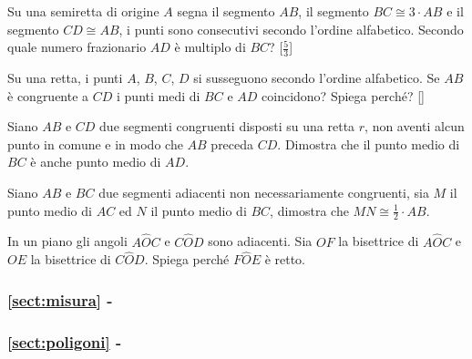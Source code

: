 \begin{multicols}{2}
 
\begin{esercizio}
\label{ese:1.84}
Su una semiretta di origine $A$ segna il segmento $AB$, il segmento 
$BC\cong 3\cdot AB$ e il segmento $CD\cong AB$, i punti sono 
consecutivi secondo l'ordine alfabetico. Secondo quale numero 
frazionario $AD$ è multiplo di $BC$?
\hfill[\(\frac{5}{3}\)]
\end{esercizio}

\begin{esercizio}
\label{ese:1.87}
Su una retta, i punti $A$, $B$, $C$, $D$ si susseguono secondo 
l'ordine alfabetico. Se $AB$ è congruente a $CD$ i punti medi di $BC$ 
e $AD$ coincidono? Spiega perché?
\hfill[]
\end{esercizio}

\begin{esercizio}
\label{ese:1.89}
Siano $AB$ e $CD$ due segmenti congruenti disposti su una retta $r$, 
non aventi alcun punto in comune e in modo che $AB$ preceda $CD$. 
Dimostra che il punto medio di $BC$ è anche punto medio di $AD$.
\end{esercizio}

\begin{esercizio}
\label{ese:1.92}
Siano $AB$ e $BC$ due segmenti adiacenti non necessariamente 
congruenti, sia $M$ il punto medio di $AC$ ed $N$ il punto medio di 
$BC$, dimostra che $MN\cong \frac{1}{2}\cdot AB$.
\end{esercizio}

\begin{esercizio}
\label{ese:1.95}
In un piano gli angoli $A\widehat{O}C$ e $C\widehat{O}D$ sono 
adiacenti. Sia $OF$ la bisettrice di $A\widehat{O}C$ e $OE$ la 
bisettrice di $C\widehat{O}D$. Spiega perché $F\widehat{O}E$ è retto.
\end{esercizio}

\begingroup
\hypersetup{linkcolor=black}
\subsubsection*{\ref{sect:misura} - }
\endgroup

\end{multicols}

\begingroup
\hypersetup{linkcolor=black}
\subsubsection*{\ref{sect:poligoni} - }
\endgroup

